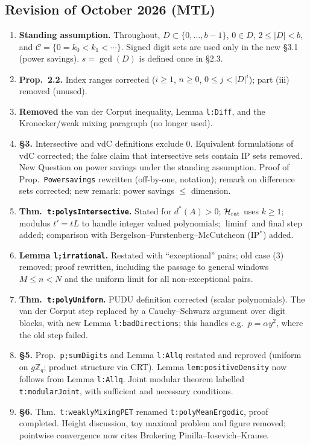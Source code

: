 \documentclass[12pt,leqno]{amsart}
\newcounter{counter}
\newcounter{counter2}
\numberwithin{equation}{section}
\numberwithin{counter2}{section}
\newcounter{theorem}
\theoremstyle{definition}
\theoremstyle{plain}
\begin{document}
\subsection{Revision of October 2026 (MTL)}
\begin{enumerate}
    \item \textbf{Standing assumption.} Throughout, $D\subset\{0,\ldots,b-1\}$, $0\in D$, $2\leq|D|<b$, and $\mathcal C=\{0=k_0<k_1<\cdots\}$. Signed digit sets are used only in the new \S3.1 (power savings). $s=\gcd(D)$ is defined once in \S2.3.
    \item \textbf{Prop.~2.2.} Index ranges corrected ($i\geq1$, $n\geq0$, $0\leq j<|D|^i$); part (iii) removed (unused).
    \item \textbf{Removed} the van der Corput inequality, Lemma \texttt{l:Diff}, and the Kronecker/weak mixing paragraph (no longer used).
    \item \textbf{\S3.} Intersective and vdC definitions exclude $0$. Equivalent formulations of vdC corrected; the false claim that intersective sets contain IP sets removed. New Question on power savings under the standing assumption. Proof of Prop.~\texttt{Powersavings} rewritten (off-by-one, notation); remark on difference sets corrected; new remark: power savings $\leq$ dimension.
    \item \textbf{Thm.~\texttt{t:polysIntersective}.} Stated for $d^\ast(A)>0$; $\mathcal H_{\rm rat}$ uses $k\geq1$; modulus $t'=tL$ to handle integer valued polynomials; $\liminf$ and final step added; comparison with Bergelson--Furstenberg--McCutcheon (IP$^\ast$) added.
    \item \textbf{Lemma \texttt{l;irrational}.} Restated with ``exceptional'' pairs; old case (3) removed; proof rewritten, including the passage to general windows $M\leq n<N$ and the uniform limit for all non-exceptional pairs.
    \item \textbf{Thm.~\texttt{t:polyUniform}.} PUDU definition corrected (scalar polynomials). The van der Corput step replaced by a Cauchy--Schwarz argument over digit blocks, with new Lemma \texttt{l:badDirections}; this handles e.g.\ $p=\alpha y^2$, where the old step failed.
    \item \textbf{\S5.} Prop.~\texttt{p;sumDigits} and Lemma \texttt{l:Allq} restated and reproved (uniform on $g\mathbb Z_q$; product structure via CRT). Lemma \texttt{lem:positiveDensity} now follows from Lemma \texttt{l:Allq}. Joint modular theorem labelled \texttt{t:modularJoint}, with sufficient and necessary conditions.
    \item \textbf{\S6.} Thm.~\texttt{t:weaklyMixingPET} renamed \texttt{t:polyMeanErgodic}, proof completed. Height discussion, toy maximal problem and figure removed; pointwise convergence now cites Brokering Pinilla--Iosevich--Krause.

\end{enumerate}
\end{document}
